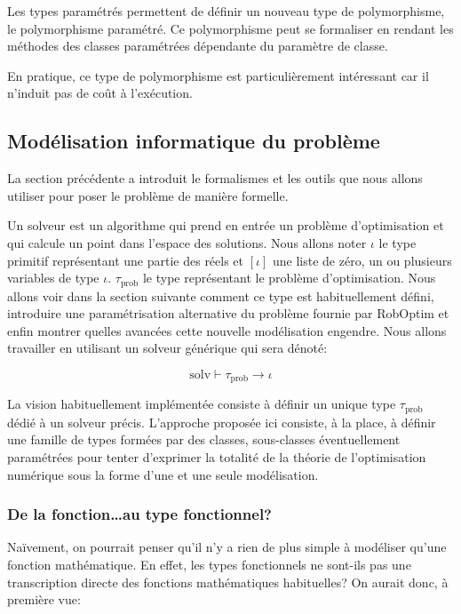 Les types paramétrés permettent de définir un nouveau type de
polymorphisme, le polymorphisme
paramétré. Ce
polymorphisme peut se formaliser en rendant les méthodes des classes
paramétrées dépendante du paramètre de classe.

En pratique, ce type de polymorphisme est particulièrement intéressant
car il n'induit pas de coût à l'exécution.


\subsection{Modélisation informatique du problème}

La section précédente a introduit le formalismes et les outils que
nous allons utiliser pour poser le problème de manière formelle.


Un solveur est un algorithme qui prend en entrée un problème
d'optimisation et qui calcule un point dans l'espace des solutions.
Nous allons noter $\iota$ le type primitif représentant une partie des
réels et $[\iota]$ une liste de zéro, un ou plusieurs variables de
type $\iota$. $\tau_{\text{prob}}$ le type représentant le problème
d'optimisation. Nous allons voir dans la section suivante comment ce
type est habituellement défini, introduire une paramétrisation
alternative du problème fournie par RobOptim et enfin montrer quelles
avancées cette nouvelle modélisation engendre.  Nous allons travailler
en utilisant un solveur générique qui sera dénoté:


\begin{equation}\label{eq:chap1_prob_type}
  \text{solv} \vdash \tau_{\text{prob}} \rightarrow \iota
\end{equation}


La vision habituellement implémentée consiste à définir un unique type
$\tau_{\text{prob}}$ dédié à un solveur précis. L'approche proposée
ici consiste, à la place, à définir une famille de types formées par
des classes, sous-classes éventuellement paramétrées pour tenter
d'exprimer la totalité de la théorie de l'optimisation numérique sous
la forme d'une et une seule modélisation.


\subsubsection{De la fonction\ldots au type fonctionnel?}


Naïvement, on pourrait penser qu'il n'y a rien de plus simple à
modéliser qu'une fonction mathématique. En effet, les types
fonctionnels ne sont-ils pas une transcription directe des fonctions
mathématiques habituelles? On aurait donc, à première vue:

